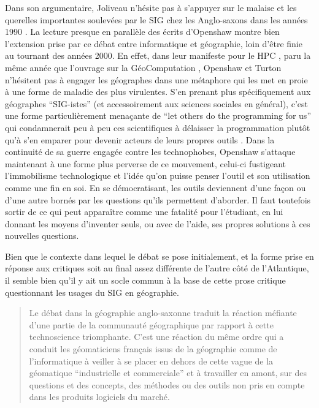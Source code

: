 Dans son argumentaire, Joliveau n'hésite pas à s'appuyer sur le malaise et les querelles importantes soulevées par le SIG chez les Anglo-saxons dans les années 1990 \autocite[472-473]{Joliveau2004}. La lecture presque en parallèle des écrits d'Openshaw montre bien l'extension prise par ce débat entre informatique et géographie, loin d'être finie au tournant des années 2000. En effet, dans leur manifeste pour le HPC \autocite[2]{Openshaw2000}, paru la même année que l'ouvrage sur la GéoComputation \autocite{Openshaw2000b},  Openshaw et Turton n’hésitent pas à engager les géographes dans une métaphore qui les met en proie à une forme de maladie des plus virulentes. S'en prenant plus spécifiquement aux géographes \enquote{SIG-istes} (et accessoirement aux sciences sociales en général), c’est une forme particulièrement menaçante de \foreignquote{english}{let others do the programming for us} qui condamnerait peu à peu ces scientifiques à délaisser la programmation plutôt qu’à s’en emparer pour devenir acteurs de leurs propres outils . Dans la continuité de sa guerre engagée contre les technophobes, Openshaw s'attaque  maintenant à une forme plus perverse de ce mouvement, celui-ci fustigeant l'immobilisme technologique et l'idée qu'on puisse penser l'outil et son utilisation comme une fin en soi. En se démocratisant, les outils deviennent d'une façon ou d'une autre bornés par les questions qu'ils permettent d'aborder. Il faut toutefois sortir de ce qui peut apparaître comme une fatalité pour l'étudiant, en lui donnant les moyens d'inventer seuls, ou avec de l'aide, ses propres solutions à ces nouvelles questions.

Bien que le contexte dans lequel le débat se pose initialement, et la forme prise en réponse aux critiques soit au final assez différente de l'autre côté de l'Atlantique, il semble bien qu'il y ait un socle commun à la base de cette prose critique questionnant les usages du SIG en géographie.

\blockquote[{\cite[474]{Joliveau2004}}]{Le débat dans la géographie anglo-saxonne traduit la réaction méfiante d'une partie de la communauté géographique par rapport à cette technoscience triomphante. C'est une réaction du même ordre qui a conduit les géomaticiens français issus de la géographie comme de l'informatique à veiller à se placer en dehors de cette vague de la géomatique \enquote{industrielle et commerciale} et à travailler en amont, sur des questions et des concepts, des méthodes ou des outils non pris en compte dans les produits logiciels du marché.}

